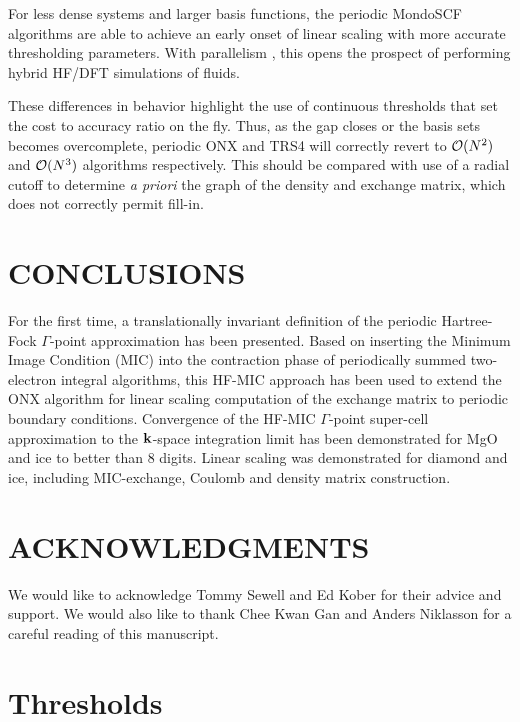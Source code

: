 \commentoutA{\documentclass[prb,aps,nobibnotes,twocolumn,doublespace,twocolumngrid,superbib,showpacs]{revtex4}}
\begin{document}
For less dense systems and larger basis functions, the periodic {\sc MondoSCF} algorithms 
are able to achieve an early onset of linear scaling with more accurate thresholding parameters.
With parallelism \cite{MChallacombe00B,CGan03,CGan04B}, this opens the prospect of performing hybrid HF/DFT simulations of fluids. 

These differences in behavior highlight the use of continuous thresholds that set the cost 
to accuracy ratio on the fly.  Thus, as the gap closes or the basis sets becomes overcomplete,  
periodic {\sc ONX} and {\sc TRS4} will correctly revert to ${\cal O}(N^2)$ and ${\cal O}(N^3)$ algorithms 
respectively.  This should be compared with  use of a radial cutoff to determine
{\em a priori } the  graph of the density and exchange matrix, which does not correctly  
permit fill-in.

\section{CONCLUSIONS}\label{conclusions}

For the first time, a translationally invariant definition of the periodic 
Hartree-Fock $\Gamma$-point approximation has been presented.  Based on inserting 
the Minimum Image Condition (MIC) into the contraction phase of periodically
summed two-electron integral algorithms,   this HF-MIC approach has been used 
to extend the {\sc ONX} algorithm for linear scaling computation of the exchange 
matrix to periodic boundary conditions.  Convergence of the HF-MIC $\Gamma$-point
super-cell approximation to the ${\bf k}$-space integration limit has been 
demonstrated for MgO and ice to better than 8 digits.  Linear scaling was 
demonstrated for diamond and ice, including MIC-exchange, Coulomb and density matrix 
construction.   

\section*{ACKNOWLEDGMENTS}

We would like to acknowledge Tommy Sewell and Ed Kober for their advice
and support. We would also like to thank Chee Kwan Gan and Anders Niklasson 
for a careful reading of this manuscript.  

 
 

\appendix

\section{Thresholds}\label{Thresholds}
\end{document}
